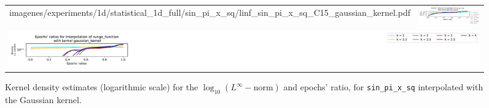 \documentclass[12pt]{report} %
\begin{document}
\begin{figure}[H]
\begin{tabular}{rl}
{    {imagenes/experiments/1d/statistical_1d_full/sin_pi_x_sq/linf_sin_pi_x_sq_C15_gaussian_kernel.pdf}}
                                                                                                              & {\includegraphics[width=.62\textwidth, trim={1.05cm 1.4cm 2.88cm 1.17cm},clip=true]
        {imagenes/experiments/1d/statistical_1d_full/sin_pi_x_sq/epochs_sin_pi_x_sq_C15_gaussian_kernel.pdf}}
    \\
    \multicolumn{2}{c}{{\includegraphics[width=.55\textwidth, trim={46cm 2.9cm 0 0},clip=true]
          {imagenes/experiments/1d/statistical_1d_full/runge_function/runge_function_legend.pdf}}}
  \end{tabular}
  \caption{Kernel density estimates (logarithmic scale) for the $\log_{10}(L^\infty-\text{norm})$ and epochs' ratio, for \texttt{sin\_pi\_x\_sq} interpolated with the Gaussian kernel.}
  \label{fig:statistic-result-kde-sin-pi-x-sq-gaussian-kernel}
\end{figure}
\end{document}
